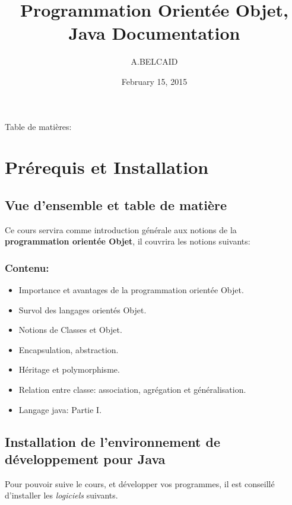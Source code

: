 \documentclass[letterpaper,10pt,english]{sphinxmanual}
\title{Programmation Orientée Objet, Java Documentation}
\date{February 15, 2015}
\author{A.BELCAID}
\begin{document}
\maketitle
\tableofcontents
{}\label{index::doc}


Table de matières:


\chapter{Prérequis et Installation}
\label{index:prerequis-et-installation}\label{index:programmation-orientee-objet-java}

\section{Vue d'ensemble et table de matière}
\label{about:vue-d-ensemble-et-table-de-matiere}\label{about:about}\label{about::doc}
Ce cours servira comme introduction générale aux notions de la \textbf{programmation  orientée Objet}, il couvrira les notions suivants:


\subsection{Contenu:}
\label{about:contenu}\begin{itemize}
\item {} 
Importance et avantages de la programmation orientée Objet.

\item {} 
Survol des langages orientés Objet.

\item {} 
Notions de Classes et Objet.

\item {} 
Encapsulation, abstraction.

\item {} 
Héritage et polymorphisme.

\item {} 
Relation entre classe: association, agrégation et généralisation.

\item {} 
Langage java: Partie I.

\end{itemize}


\section{Installation de l’environnement de développement pour Java}
\label{installation:installation}\label{installation::doc}\label{installation:installation-de-lenvironnement-de-developpement-pour-java}
Pour pouvoir suive le cours, et développer vos programmes, il est conseillé d'installer les \emph{logiciels} suivants.
\end{document}
